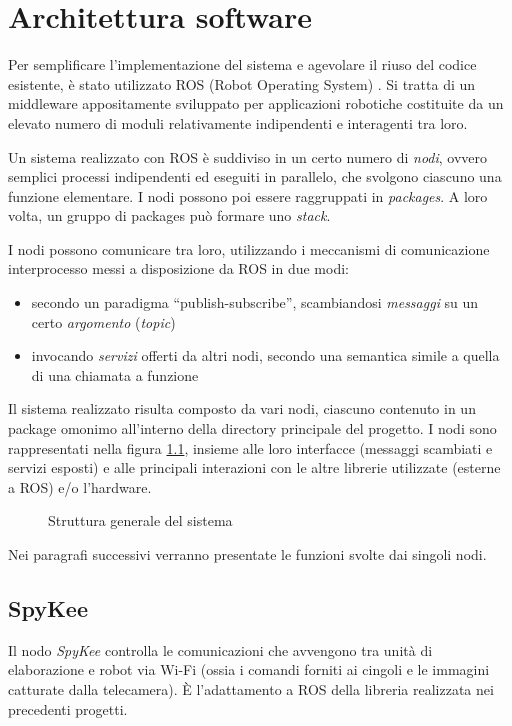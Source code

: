 \chapter{Architettura software}
\label{cap:architetturasw}

Per semplificare l'implementazione del sistema e agevolare il riuso del codice esistente, è stato utilizzato ROS (Robot Operating System) \cite{rosweb}. Si tratta di un middleware appositamente sviluppato per applicazioni robotiche costituite da un elevato numero di moduli relativamente indipendenti e interagenti tra loro.

Un sistema realizzato con ROS è suddiviso in un certo numero di \emph{nodi}, ovvero semplici processi indipendenti ed eseguiti in parallelo, che svolgono ciascuno una funzione elementare. I nodi possono poi essere raggruppati in \emph{packages}. A loro volta, un gruppo di packages può formare uno \emph{stack}.

I nodi possono comunicare tra loro, utilizzando i meccanismi di comunicazione interprocesso messi a disposizione da ROS in due modi:
\begin{itemize}
 \item secondo un paradigma ``publish-subscribe'', scambiandosi \emph{messaggi} su un certo \emph{argomento} (\emph{topic})
 \item invocando \emph{servizi} offerti da altri nodi, secondo una semantica simile a quella di una chiamata a funzione
\end{itemize}

Il sistema realizzato risulta composto da vari nodi, ciascuno contenuto in un package omonimo all'interno della directory principale del progetto. I nodi sono rappresentati nella figura \ref{fig:schemanodi}, insieme alle loro interfacce (messaggi scambiati e servizi esposti) e alle principali interazioni con le altre librerie utilizzate (esterne a ROS) e/o l'hardware.

\begin{figure}[h]

\caption{Struttura generale del sistema} 
\label{fig:schemanodi}
\end{figure}

Nei paragrafi successivi verranno presentate le funzioni svolte dai singoli nodi.


\section{SpyKee}
Il nodo \emph{SpyKee} controlla le comunicazioni che avvengono tra unità di elaborazione e robot via Wi-Fi (ossia i comandi forniti ai cingoli e le immagini catturate dalla telecamera). È l'adattamento a ROS della libreria realizzata nei precedenti progetti.

